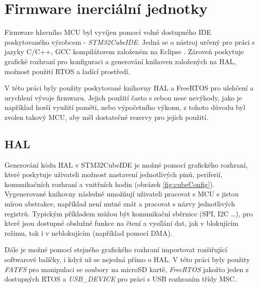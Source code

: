 \chapter{Firmware inerciální jednotky}
Firmware hlavního \ac{MCU} byl vyvíjen pomocí volně dostupného \ac{IDE} poskytovaného výrobcem - \emph{STM32CubeIDE}. Jedná se o nástroj určený pro práci s jazyky C/C++, GCC kompilátorem založeném na Eclipse \cite{V2Tf5wsrbWcbQdoW}. Zároveň poskytuje grafické rozhraní pro konfiguraci a generování knihoven založených na \ac{HAL}, možnost použití \ac{RTOS} a ladící prostředí.

V této práci byly použity poskytované knihovny HAL a FreeRTOS pro ulehčení a urychlení vývoje firmwaru. Jejich použití často s sebou nese nevýhody, jako je například horší využití paměti, nebo výpočetního výkonu, z tohoto důvodu byl zvolen takový \ac{MCU}, aby měl dostatečné rezervy pro jejich použití.
\section{HAL}
Generování kódu \ac{HAL} v  STM32CubeIDE je možné pomocí grafického rozhraní, které poskytuje uživateli možnost nastavení jednotlivých pinů, periferií, komunikačních rozhraní a vnitřních hodin (obrázek \ref{fig:cubeConfig}). Vygenerované knihovny následně umožňují uživateli pracovat s \ac{MCU} s jistou mírou abstrakce, například není nutné znát a pracovat s názvy jednotlivých registrů. Typickým příkladem můžou být komunikační sběrnice (\ac{SPI}, \ac{I2C} \ldots), pro které jsou dostupné obslužné funkce na čtení a vysílání dat, jak v blokujícím režimu, tak i v neblokujícím (například pomocí \ac{DMA}). \cite{V2Tf5wsrbWcbQdoW}

Dále je možné pomocí stejného grafického rozhraní importovat rozšiřující softwarové balíčky, i když už se nejedná přímo o \ac{HAL}. V této práci byly použity \emph{FATFS} pro manipulaci se soubory na microSD kartě, \emph{FreeRTOS} jakožto jeden z dostupných \ac{RTOS} a \emph{USB\_DEVICE} pro práci s \ac{USB} rozhraním třídy \ac{MSC}.

